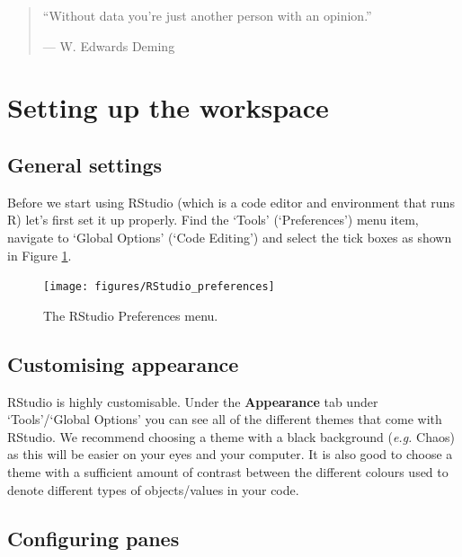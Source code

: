 \documentclass[
]{book}
\begin{document}
\begin{quote}
``Without data you're just another person with an opinion.''

--- W. Edwards Deming
\end{quote}

\hypertarget{setting-up-the-workspace}{%
\section{Setting up the workspace}\label{setting-up-the-workspace}}

\hypertarget{general-settings}{%
\subsection{General settings}\label{general-settings}}

Before we start using RStudio (which is a code editor and environment that runs R) let's first set it up properly. Find the `Tools' (`Preferences') menu item, navigate to `Global Options' (`Code Editing') and select the tick boxes as shown in Figure \ref{fig:RStudio-prefs}.

\begin{figure}

{\centering \texttt{[image: figures/RStudio\_preferences]} 

}

\caption{The RStudio Preferences menu.}\label{fig:RStudio-prefs}
\end{figure}

\hypertarget{customising-appearance}{%
\subsection{Customising appearance}\label{customising-appearance}}

RStudio is highly customisable. Under the \textbf{Appearance} tab under `Tools'/`Global Options' you can see all of the different themes that come with RStudio. We recommend choosing a theme with a black background (\emph{e.g.} Chaos) as this will be easier on your eyes and your computer. It is also good to choose a theme with a sufficient amount of contrast between the different colours used to denote different types of objects/values in your code.

\hypertarget{configuring-panes}{%
\subsection{Configuring panes}\label{configuring-panes}}
\end{document}
